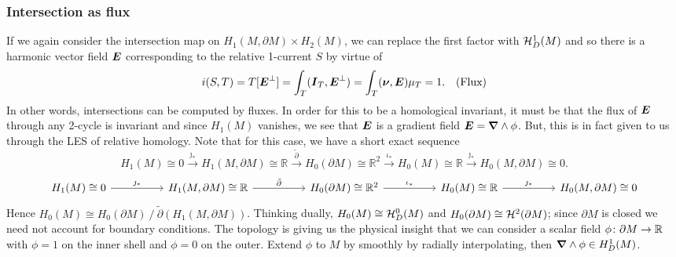 \documentclass{article}
\begin{document}
\subsubsection{Intersection as flux}
If we again consider the intersection map on $H_1(M,\partial M) \times H_{2}(M)$, we can replace the first factor with $\mathcal{H}^1_D(M)$ and so there is a harmonic vector field $\boldsymbol{E}$ corresponding to the relative 1-current $S$ by virtue of
\begin{align*}
i(S,T) = T[\boldsymbol{E}^\perp] = \int_T(\boldsymbol{I}_T,\boldsymbol{E}^\perp)= \int_T (\boldsymbol{\nu},\boldsymbol{E}) \mu_T = 1. && \textrm{(Flux)}
\end{align*}
In other words, intersections can be computed by fluxes. In order for this to be a homological invariant, it must be that the flux of $\boldsymbol{E}$ through any 2-cycle is invariant and since $H_1(M)$ vanishes, we see that $\boldsymbol{E}$ is a gradient field $\boldsymbol{E}=\boldsymbol{\nabla} \wedge \phi$. But, this is in fact given to us through the LES of relative homology. Note that for this case, we have a short exact sequence 
\[
H_1(M) \cong 0 \xrightarrow{~\jmath_*~} H_1(M,\partial M)\cong \mathbb{R} \xrightarrow{~\tilde{\partial}~} H_0(\partial M) \cong \mathbb{R}^2 \xrightarrow{~\iota_*~} H_0(M)\cong \mathbb{R} \xrightarrow{~\jmath_*~} H_0(M, \partial M)\cong 0.
\]
\[
\begin{tikzcd}
H_1(M)\cong 0 \arrow[rr, "\jmath_*"] &  & {H_1(M,\partial M)\cong \mathbb{R}} \arrow[rr, "\tilde{\partial}"] &  & H_0(\partial M) \cong \mathbb{R}^2 \arrow[rr, "\iota_*"] &  & H_0(M)\cong \mathbb{R} \arrow[rr, "\jmath_*"] &  & {H_0(M,\partial M)\cong 0}
\end{tikzcd}
\]
Hence $H_0(M)\cong H_0(\partial M)~/~ \tilde{\partial}(H_1(M,\partial M))$. Thinking dually, $H_0(M)\cong\mathcal{H}^0_D(M)$ and $H_0(\partial M)\cong \mathcal{H}^2(\partial M)$; since $\partial M$ is closed we need not account for boundary conditions.  The topology is giving us the physical insight that we can consider a scalar field $\phi \colon \partial M \to \mathbb{R}$ with $\phi=1$ on the inner shell and $\phi=0$ on the outer. Extend $\phi$ to $M$ by smoothly by radially interpolating, then $\boldsymbol{\nabla} \wedge \phi \in H^1_D(M)$. 
\end{document}
